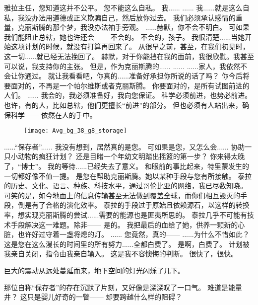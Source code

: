 \documentclass[openany]{book}
\begin{document}
\begin{dialogue}
     雅拉主任，您知道这并不公平。
     您不能这么自私。
     我......
     ......
     我......就是这么自私，我没办法用道德或正义欺骗自己，然后放你过去。
     我们必须承认感情的重量，克丽斯腾的那个梦，我没办法袖手旁观。
     ......赫默，你不会不明白。
     可如果我们能阻止总辖，她也许还会——
     不会的。
     不会的，孩子。
     我很清楚......当她开始这项计划的时候，就没有打算再回来了。
     从很早之前，甚至，在我们初见时，这一切......就已经无法挽回了。
     赫默，对于你能挡在我的面前，我很欣慰。我甚至可以说，我支持你的主张。
     但是，作为克丽斯腾的......
     ......
     ......家人，我依然不会让你通过。
     就让我看看吧，你真的......准备好承担你所说的话了吗？
     你今后将要面对的，不再是一个帕尔维斯或者克丽斯腾。
     你要面对的，是所有试图前进的人们。
     ......
     我会的，我必须准备好，我向您保证。
     科学必须前进，也势必前进。
     也许，有的人，比如总辖，他们更擅长“前进”的部分。
     但也必须有人站出来，确保科学——
     依然在人的手中。
\end{dialogue}

\begin{figure}[h]
    \centering
    \texttt{[image: Avg\_bg\_38\_g8\_storage]}
\end{figure}
\begin{dialogue}
     ......“保存者”......
     我没有想到，居然真的是您。
     可如果是您，又怎么会......
     协助一只小动物的疯狂计划？
     还是目睹一个年幼文明踏出摇篮的第一步？
     你来得太晚了，“博士”。
     我的等待......已经失去了意义。
     和眼前的事比起来，特里蒙发生的一切都好像不值一提。
     是您在帮助克丽斯腾。她以某种手段与您有所接触。
     泰拉的历史、文化、语言、种族、科技水平，通过哥伦比亚的网络，我已尽数知晓。
     可笑的是，如今地面上的信息传输甚至无法做到覆盖全球，而你们相互毁灭的手段，倒是有了合格的演化效率。
     泰拉的手段过于原始且依赖源石，以这样的转换率，想实现克丽斯腾的尝试......需要的能源也是匪夷所思的。
     泰拉几乎不可能有技术手段解决这一难题。除非——
     是的。
     我把最后的血给了她，供养一颗新的心脏，也许好过守着一盏将熄的灯。
     ......
     您竟然，真的——
     ......为什么不惜如此？这是您在这么漫长的时间里的所有努力......全都白费了。
     是啊，白费了。
     计划被我亲自关闭，指令由我亲自输入。
     这是我不容懊悔的判断。
     很快了，很快。\par
    巨大的震动从远处蔓延而来，地下空间的灯光闪烁了几下。\par
    那位自称“保存者”的存在沉默了片刻，又好像是深深叹了一口气。
     难道是能量井？
     这只是婴儿好奇的一瞥——
     却要跨越什么样的阻碍？
\end{dialogue}
\end{document}
